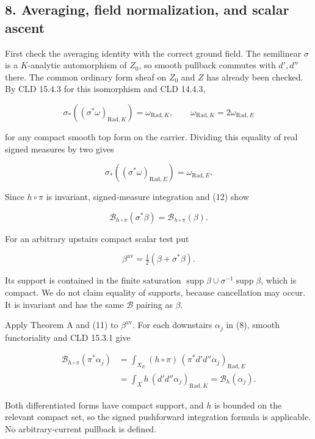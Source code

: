 \documentclass[
  11pt,
]{article}
\begin{document}
\subsection{8. Averaging, field normalization, and scalar
ascent}\label{averaging-field-normalization-and-scalar-ascent}

First check the averaging identity with the correct ground field. The
semilinear \(\sigma\) is a \(K\)-analytic automorphism of \(Z_0\), so
smooth pullback commutes with \(d',d''\) there. The common ordinary form
sheaf on \(Z_0\) and \(Z\) has already been checked. By CLD 15.4.3 for
this isomorphism and CLD 14.4.3,

\[
\sigma_*((\sigma^*\omega)_{\mathrm{Rad},K})=\omega_{\mathrm{Rad},K},
\qquad \omega_{\mathrm{Rad},K}=2\omega_{\mathrm{Rad},E}
\]

for any compact smooth top form on the carrier. Dividing this equality
of real signed measures by two gives

\[\sigma_*((\sigma^*\omega)_{\mathrm{Rad},E})=\omega_{\mathrm{Rad},E}. \tag{12}\]

Since \(h\circ\pi\) is invariant, signed-measure integration and (12)
show

\[\mathcal B_{h\circ\pi}(\sigma^*\beta)=\mathcal B_{h\circ\pi}(\beta).\]

For an arbitrary upstairs compact scalar test put

\[\beta^{\mathrm{av}}=\tfrac12(\beta+\sigma^*\beta).\]

Its support is contained in the finite saturation
\(\operatorname{supp}\beta\cup\sigma^{-1}\operatorname{supp}\beta\),
which is compact. We do not claim equality of supports, because
cancellation may occur. It is invariant and has the same \(\mathcal B\)
pairing as \(\beta\).

Apply Theorem A and (11) to \(\beta^{\mathrm{av}}\). For each downstairs
\(\alpha_j\) in (8), smooth functoriality and CLD 15.3.1 give

\[
\begin{aligned}
\mathcal B_{h\circ\pi}(\pi^*\alpha_j)
&=\int_{X_E}(h\circ\pi)\,(\pi^*d'd''\alpha_j)_{\mathrm{Rad},E}\\
&=\int_Xh\,(d'd''\alpha_j)_{\mathrm{Rad},K}
=\mathcal B_h(\alpha_j).
\end{aligned} \tag{13}
\]

Both differentiated forms have compact support, and \(h\) is bounded on
the relevant compact set, so the signed pushforward integration formula
is applicable. No arbitrary-current pullback is defined.
\end{document}

